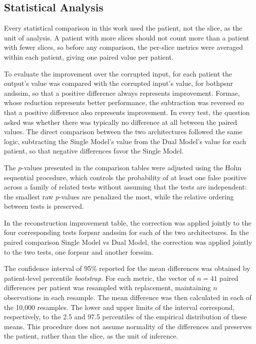 \subsection{Statistical Analysis}
Every statistical comparison in this work used the patient, not the slice, as the unit of analysis. A patient with more slices should not count more than a patient with fewer slices, so before any comparison, the per-slice metrics were averaged within each patient, giving one paired value per patient.

To evaluate the improvement over the corrupted input, for each patient the output's value was compared with the corrupted input's value, for both\acrshort{psnr} and\acrshort{ssim}, so that a positive difference always represents improvement. For\acrshort{mae}, whose reduction represents better performance, the subtraction was reversed so that a positive difference also represents improvement. In every test, the question asked was whether there was typically no difference at all between the paired values. The direct comparison between the two architectures followed the same logic, subtracting the Single Model's value from the Dual Model's value for each patient, so that negative differences favor the Single Model.

The $p$-values presented in the comparison tables were adjusted using the Holm sequential procedure, which controls the probability of at least one false positive across a family of related tests without assuming that the tests are independent: the smallest raw $p$-values are penalized the most, while the relative ordering between tests is preserved.

In the reconstruction improvement table, the correction was applied jointly to the four corresponding tests for\acrshort{psnr} and\acrshort{ssim} for each of the two architectures. In the paired comparison Single Model vs Dual Model, the correction was applied jointly to the two tests, one for\acrshort{psnr} and another for\acrshort{ssim}.

The confidence interval of 95\% reported for the mean differences was obtained by patient-level percentile \textit{bootstrap}. For each metric, the vector of $n=41$ paired differences per patient was resampled with replacement, maintaining $n$ observations in each resample. The mean difference was then calculated in each of the 10,000 resamples. The lower and upper limits of the interval correspond, respectively, to the 2.5 and 97.5 percentiles of the empirical distribution of these means. This procedure does not assume normality of the differences and preserves the patient, rather than the slice, as the unit of inference.
